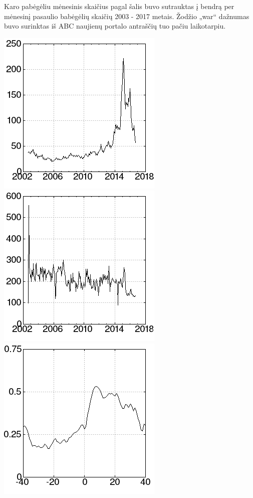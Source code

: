 Karo pabėgėliu mėnesinis skaičius pagal šalis\cite{refugees} buvo sutrauktas į bendrą per mėnesinį pasaulio babėgėlių skaičių 2003 - 2017 metais.
Žodžio „war“ dažnumas buvo surinktas iš ABC naujienų portalo antraščių\cite{abcNews} tuo pačiu laikotarpiu.

\includegraphics[scale=0.65]{../scripts/refugees_war/refugees.png}
\includegraphics[scale=0.65]{../scripts/refugees_war/war.png}
\includegraphics[scale=0.65]{../scripts/refugees_war/result.png}
